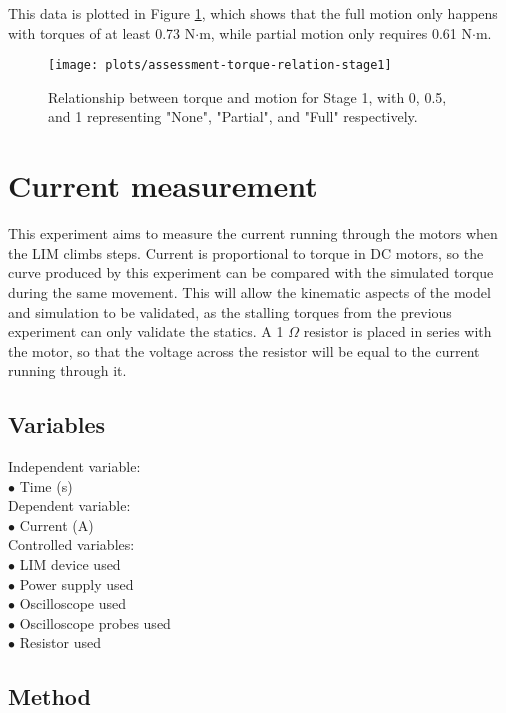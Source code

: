 This data is plotted in Figure \ref{plotassessment-torque-relation-stage1}, which shows that the full motion only happens with torques of at least 0.73 N$\cdot$m, while partial motion only requires 0.61 N$\cdot$m.

\begin{figure}[h]
	\centering
	\texttt{[image: plots/assessment-torque-relation-stage1]}
	\caption{Relationship between torque and motion for Stage 1, with 0, 0.5, and 1 representing "None", "Partial", and "Full" respectively.}
	\label{plotassessment-torque-relation-stage1}
\end{figure}

\section{Current measurement}
This experiment aims to measure the current running through the motors when the LIM climbs steps. Current is proportional to torque in DC motors, so the curve produced by this experiment can be compared with the simulated torque during the same movement. This will allow the kinematic aspects of the model and simulation to be validated, as the stalling torques from the previous experiment can only validate the statics. A 1 $\Omega$ resistor is placed in series with the motor, so that the voltage across the resistor will be equal to the current running through it.\\

\subsection{Variables}
Independent variable:\\
$\bullet$ Time (s)\\
Dependent variable:\\
$\bullet$ Current (A)\\
Controlled variables:\\
$\bullet$ LIM device used\\
$\bullet$ Power supply used\\
$\bullet$ Oscilloscope used\\
$\bullet$ Oscilloscope probes used\\
$\bullet$ Resistor used\\

\subsection{Method}

